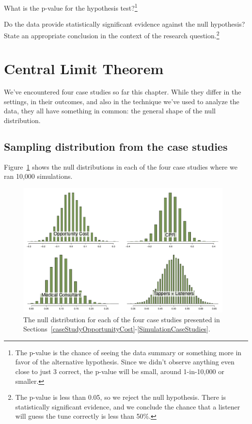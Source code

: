 \begin{exercise}
What is the p-value for the hypothesis test?\footnote{The p-value is the chance of seeing the data summary or something more in favor of the alternative hypothesis. Since we didn't observe anything even close to just 3 correct, the p-value will be small, around 1-in-10,000 or smaller.}
\end{exercise}

\begin{exercise}
Do the data provide statistically significant evidence against the null hypothesis? State an appropriate conclusion in the context of the research question.\footnote{The p-value is less than 0.05, so we reject the null hypothesis. There is statistically significant evidence, and we conclude the chance that a listener will guess the tune correctly is less than 50\%.}
\end{exercise}


\section{Central Limit Theorem}
\label{CLTsection}

We've encountered four case studies so far this chapter. While they differ in the settings, in their outcomes, and also in the technique we've used to analyze the data, they all have something in common: the general shape of the null distribution.

\subsection{Sampling distribution from the case studies}

Figure~\ref{FourCaseStudies} shows the null distributions in each of the four case studies where we ran 10,000 simulations.

\begin{figure}[ht]
\centering
\includegraphics[width=0.97\textwidth]{02/figures/FourCaseStudies/FourCaseStudies}
\caption{The null distribution for each of the four case studies presented in Sections~\ref{caseStudyOpportunityCost}-\ref{SimulationCaseStudies}.}
\label{FourCaseStudies}
\end{figure}


